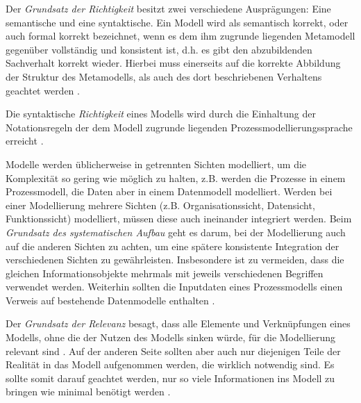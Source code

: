 Der \textit{Grundsatz der Richtigkeit} besitzt zwei verschiedene Ausprägungen: Eine semantische und eine syntaktische. Ein Modell wird als semantisch korrekt, oder auch formal korrekt bezeichnet, wenn es dem ihm zugrunde liegenden Metamodell gegenüber vollständig und konsistent ist, d.h. es gibt den abzubildenden Sachverhalt korrekt wieder. Hierbei muss einerseits auf die korrekte Abbildung der Struktur des Metamodells, als auch des dort beschriebenen Verhaltens geachtet werden \cite{journals95, becker2012prozessmanagement}. \newline

Die syntaktische \textit{Richtigkeit} eines Modells wird durch die Einhaltung der Notationsregeln der dem Modell zugrunde liegenden Prozessmodellierungssprache erreicht \cite{journals95, becker2012prozessmanagement}. \newline

Modelle werden üblicherweise in getrennten Sichten modelliert, um die Komplexität so gering wie möglich zu halten, z.B. werden die Prozesse in einem Prozessmodell, die Daten aber in einem Datenmodell modelliert. Werden bei einer Modellierung mehrere Sichten (z.B. Organisationssicht, Datensicht, Funktionssicht) modelliert, müssen diese auch ineinander integriert werden. Beim  \textit{Grundsatz des systematischen Aufbau} geht es darum, bei der Modellierung auch auf die anderen Sichten zu achten, um eine spätere konsistente Integration der verschiedenen Sichten zu gewährleisten. Insbesondere ist zu vermeiden, dass die gleichen Informationsobjekte mehrmals mit jeweils verschiedenen Begriffen verwendet werden. Weiterhin sollten die Inputdaten eines Prozessmodells einen Verweis auf bestehende Datenmodelle enthalten \cite{journals95, freund2007, becker2012prozessmanagement,koch2011}.\newline

Der \textit{Grundsatz der Relevanz} besagt, dass alle Elemente und Verknüpfungen eines Modells, ohne die der Nutzen des Modells sinken würde, für die Modellierung relevant sind \cite{journals95, reinshagen2009}. Auf der anderen Seite sollten aber auch nur diejenigen Teile der Realität in das Modell aufgenommen werden, die wirklich notwendig sind. Es sollte somit darauf geachtet werden, nur so viele Informationen ins Modell zu bringen wie minimal benötigt werden \cite{journals95, freund2007,reinshagen2009}.\newline


